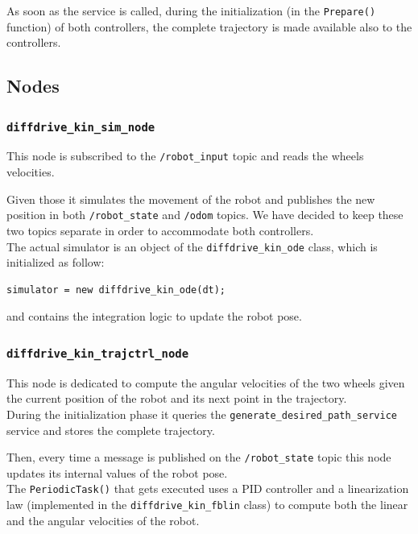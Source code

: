 \documentclass[11pt,a4paper]{article}
\begin{document}
As soon as the service is called, during the initialization (in the \texttt{Prepare()} function) of both controllers, the complete trajectory is made available also to the controllers.


\subsection{Nodes}

\subsubsection{\texttt{diffdrive\_kin\_sim\_node}}

This node is subscribed to the \texttt{/robot\_input} topic and reads the wheels velocities.

Given those it simulates the movement of the robot and publishes the new position in both \texttt{/robot\_state} and \texttt{/odom} topics. We have decided to keep these two topics separate in order to accommodate both controllers.\\

The actual simulator is an object of the \texttt{diffdrive\_kin\_ode} class, which is initialized as follow:
\begin{lstlisting}
simulator = new diffdrive_kin_ode(dt);
\end{lstlisting}

and contains the integration logic to update the robot pose.

\subsubsection{\texttt{diffdrive\_kin\_trajctrl\_node}}

This node is dedicated to compute the angular velocities of the two wheels given the current position of the robot and its next point in the trajectory.\\

During the initialization phase it queries the \texttt{generate\_desired\_path\_service} service and stores the complete trajectory.

Then, every time a message is published on the \texttt{/robot\_state} topic this node updates its internal values of the robot pose.\\

The \texttt{PeriodicTask()} that gets executed uses a PID controller and a linearization law (implemented in the \texttt{diffdrive\_kin\_fblin} class) to compute both the linear and the angular velocities of the robot.
\end{document}
